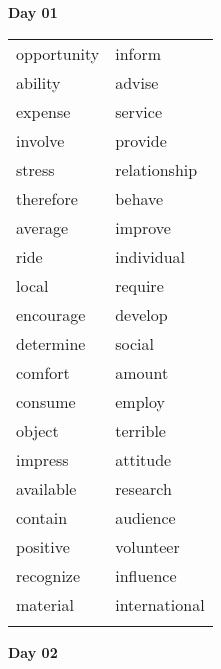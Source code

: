 \documentclass[9pt, a4paper, landscape, twocolumn]{oblivoir}
\begin{document}
    \noindent
    \textbf{\Huge Day 01}\\

    \begin{tabu}{X[2]X[2]}
        \tabucline{-}
        opportunity & inform \\
        ability & advise \\
        expense & service \\
        involve & provide \\
        stress & relationship \\
        therefore & behave \\
        average & improve \\
        ride & individual \\
        local & require \\
        encourage & develop \\
        determine & social \\
        comfort & amount \\
        consume & employ \\
        object & terrible \\
        impress & attitude \\
        available & research \\
        contain & audience \\
        positive & volunteer \\
        recognize & influence \\
        material & international \\
        \tabucline{-} \\ 
    \end{tabu}


    \noindent
    \textbf{\Huge Day 02}\\
\end{document}
